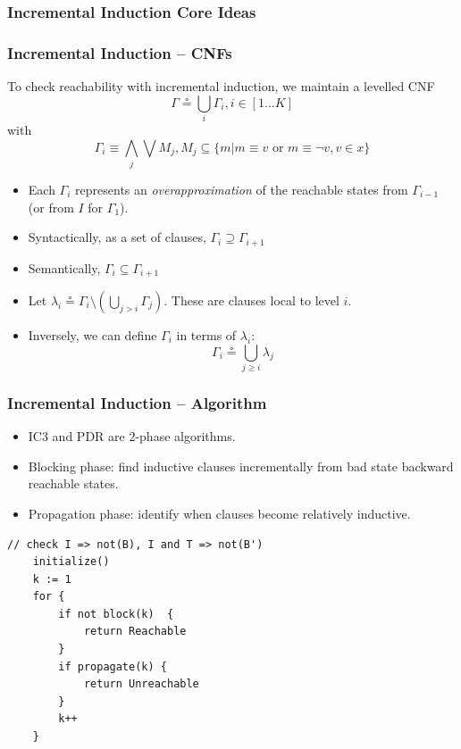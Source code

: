 \documentclass{beamer}
\begin{document}
\subsubsection{Incremental Induction Core Ideas}
\begin{frame}
	\frametitle{Incremental Induction -- CNFs}
To check reachability with incremental induction, we maintain a levelled CNF
	\[
		\Gamma \circeq \bigcup_i \Gamma_i, i \in [1\ldots K]
	\]
with
	\[
		\Gamma_i \equiv \bigwedge_j \bigvee M_j, M_j \subseteq \{ m | m \equiv v \mbox{ or } m \equiv \neg v, v \in x \}
	\]
\begin{itemize}
	\item Each $\Gamma_i$ represents an {\em overapproximation} of the reachable states
		from $\Gamma_{i-1}$ (or from $I$ for $\Gamma_1$).
	\item Syntactically, as a set of clauses, $\Gamma_i \supseteq \Gamma_{i+1}$
	\item Semantically, $\Gamma_i \subseteq \Gamma_{i+1}$
	\item Let $\lambda_i \circeq \Gamma_i \setminus (\bigcup_{j> i} \Gamma_j)$.
		These are clauses local to level $i$.
	\item Inversely, we can define $\Gamma_i$ in terms of $\lambda_i$:
		\[
			\Gamma_i \circeq \bigcup_{j \ge i} \lambda_j
			\]
\end{itemize}
\end{frame}

\begin{frame}[fragile]
	\frametitle{Incremental Induction -- Algorithm}
	\begin{itemize}
		\item IC3 and PDR are $2$-phase algorithms.
		\item Blocking phase: find inductive clauses incrementally from 
			bad state backward reachable states.
		\item Propagation phase: identify when clauses become relatively inductive.
	\end{itemize}
	\begin{lstlisting}[basicstyle=\small]
	// check I => not(B), I and T => not(B')
	initialize() 
	k := 1
	for {
		if not block(k)  {
			return Reachable
		}
		if propagate(k) {
			return Unreachable
		}
		k++
	}
	\end{lstlisting}
\end{frame}
\end{document}
